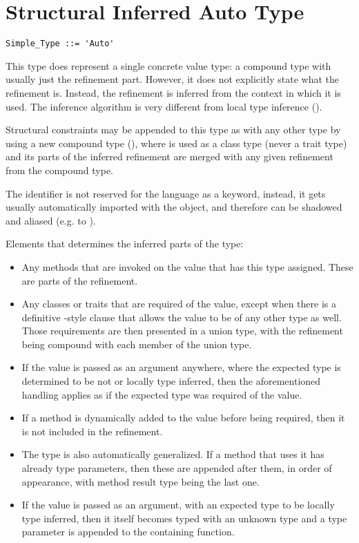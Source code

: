 \section{Structural Inferred Auto Type}
\label{sec:auto-type}

\syntax\begin{lstlisting}
Simple_Type ::= 'Auto'
\end{lstlisting}

This type does represent a single concrete value type: a compound type with usually just the refinement part. However, it does not explicitly state what the refinement is. Instead, the refinement is inferred from the context in which it is used. The inference algorithm is very different from local type inference (). 

Structural constraints may be appended to this type as with any other type by using a new compound type (), where  is used as a class type (never a trait type) and its parts of the inferred refinement are merged with any given refinement from the compound type. 

The  identifier is not reserved for the language as a keyword, instead, it gets usually automatically imported with the  object, and therefore can be shadowed and aliased (e.g. to ). 

Elements that determines the inferred parts of the  type:

\begin{itemize}
  \item Any methods that are invoked on the value that has this type assigned. These are parts of the refinement. 
  \item Any classes or traits that are required of the value, except when there is a definitive -style clause that allows the value to be of any other type as well. Those requirements are then presented in a union type, with the refinement being compound with each member of the union type. 
  \item If the value is passed as an argument anywhere, where the expected type is determined to be not  or locally type inferred, then the aforementioned handling applies as if the expected type was required of the value.
  \item If a method is dynamically added to the value before being required, then it is not included in the refinement. 
  \item The  type is also automatically generalized. If a method that uses it has already type parameters, then these are appended after them, in order of appearance, with method result type being the last one. 
  \item If the value is passed as an argument, with an expected type to be locally type inferred, then it itself becomes typed with an unknown type and a type parameter is appended to the containing function.
\end{itemize}

